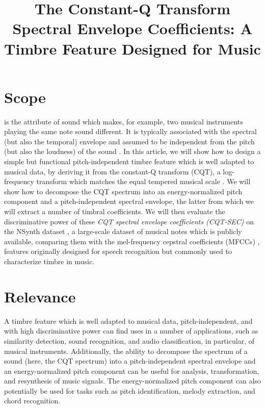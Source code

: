 \documentclass[journal]{IEEEtran}
\begin{document}
\title{The Constant-Q Transform Spectral Envelope Coefficients: A Timbre Feature Designed for Music}

\maketitle

\section{Scope}

 is the attribute of sound which makes, for example, two musical instruments playing the same note sound different. It is typically associated with the spectral (but also the temporal) envelope and assumed to be independent from the pitch (but also the loudness) of the sound \cite{moore2004}. In this article, we will show how to design a simple but functional pitch-independent timbre feature which is well adapted to musical data, by deriving it from the constant-Q transform (CQT), a log-frequency transform which matches the equal tempered musical scale \cite{brown1991, brown1992}. We will show how to decompose the CQT spectrum into an energy-normalized pitch component and a pitch-independent spectral envelope, the latter from which we will extract a number of timbral coefficients. We will then evaluate the discriminative power of these \textit{CQT spectral envelope coefficients (CQT-SEC)} on the NSynth dataset \cite{engel2017}, a large-scale dataset of musical notes which is publicly available, comparing them with the mel-frequency cepstral coefficients (MFCCs) \cite{mermelstein1976}, features originally designed for speech recognition but commonly used to characterize timbre in music. 


\section{Relevance}

A timbre feature which is well adapted to musical data, pitch-independent, and with high discriminative power can find uses in a number of applications, such as similarity detection, sound recognition, and audio classification, in particular, of musical instruments. Additionally, the ability to decompose the spectrum of a sound (here, the CQT spectrum) into a pitch-independent spectral envelope and an energy-normalized pitch component can be useful for analysis, transformation, and resynthesis of music signals. The energy-normalized pitch component can also potentially be used for tasks such as pitch identification, melody extraction, and chord recognition.
\end{document}
